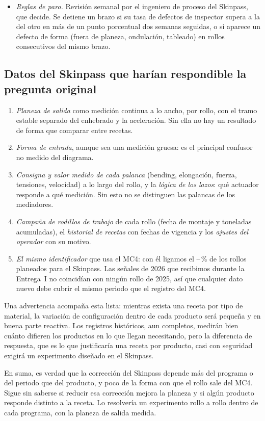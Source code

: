 \begin{itemize}
      única (\ExpDeltaDif~kN) harían falta \ExpTodoDifRollos{} rollos, más de una década de producción. Ese es un
      hallazgo en sí mismo: con lo que hoy se mide, la diferenciación por producto no se puede validar
      experimentalmente en un plazo razonable, y no es donde está la mayor parte de la corrección.
\item \emph{Reglas de paro.} Revisión semanal por el ingeniero de proceso del Skinpass, que decide. Se detiene un
      brazo si su tasa de defectos de inspector supera a la del otro en más de un punto porcentual dos semanas seguidas, o
      si aparece un defecto de forma (fuera de planeza, ondulación, tableado) en rollos consecutivos del mismo brazo.
\end{itemize}

\subsection{Datos del Skinpass que harían respondible la pregunta original}
\begin{enumerate}
\item \emph{Planeza de salida} como medición continua a lo ancho, por rollo, con el tramo estable separado del enhebrado
      y la aceleración. Sin ella no hay un resultado de forma que comparar entre recetas.
\item \emph{Forma de entrada}, aunque sea una medición gruesa: es el principal confusor no medido del diagrama.
\item \emph{Consigna y valor medido de cada palanca} (bending, elongación, fuerza, tensiones, velocidad) a lo largo del
      rollo, y la \emph{lógica de los lazos}: qué actuador responde a qué medición. Sin esto no se distinguen las
      palancas de los mediadores.
\item \emph{Campaña de rodillos de trabajo} de cada rollo (fecha de montaje y toneladas acumuladas), el \emph{historial
      de recetas} con fechas de vigencia y los \emph{ajustes del operador} con su motivo.
\item \emph{El mismo identificador} que usa el MC4: con él ligamos el \PctCalienteEnSKP--\PctDecapadoEnSKP\,\% de los
      rollos planeados para el Skinpass. Las señales de 2026 que recibimos durante la Entrega~I no coincidían con ningún
      rollo de 2025, así que cualquier dato nuevo debe cubrir el mismo periodo que el registro del MC4.
\end{enumerate}
Una advertencia acompaña esta lista: mientras exista una receta por tipo de material, la variación de configuración
dentro de cada producto será pequeña y en buena parte reactiva. Los registros históricos, aun completos, medirán bien
cuánto difieren los productos en lo que llegan necesitando, pero la diferencia de respuesta, que es lo que justificaría
una receta por producto, casi con seguridad exigirá un experimento diseñado en el Skinpass.

En suma, es verdad que la corrección del Skinpass depende más del programa o del periodo que del producto, y poco de la
forma con que el rollo sale del MC4. Sigue sin saberse si reducir esa corrección mejora la planeza y si algún producto
responde distinto a la receta. Lo resolvería un experimento rollo a rollo dentro de cada programa, con la planeza de
salida medida.
